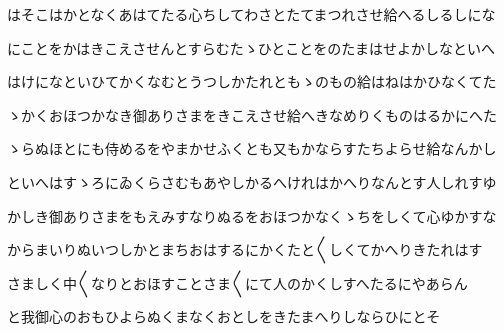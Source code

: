 \documentclass[a4paper,11pt,landscape]{ltjtarticle}
\begin{document}
\par\medskip
はそこはかとなくあはてたる心ちしてわさとたてまつれさせ給へるしるしにな
\par\medskip
にことをかはきこえさせんとすらむたゝひとことをのたまはせよかしなといへ
\par\medskip
はけになといひてかくなむとうつしかたれともゝのもの給はねはかひなくてた
\par\medskip
ゝかくおほつかなき御ありさまをきこえさせ給へきなめりくものはるかにへた
\par\medskip
ゝらぬほとにも侍めるをやまかせふくとも又もかならすたちよらせ給なんかし
\par\medskip
といへはすゝろにゐくらさむもあやしかるへけれはかへりなんとす人しれすゆ
\par\medskip
かしき御ありさまをもえみすなりぬるをおほつかなくゝちをしくて心ゆかすな
\par\medskip
からまいりぬいつしかとまちおはするにかくたと〱しくてかへりきたれはす
\par\medskip
さましく中〱なりとおほすことさま〱にて人のかくしすへたるにやあらん
\par\medskip
と我御心のおもひよらぬくまなくおとしをきたまへりしならひにとそ
\par\medskip
\end{document}
